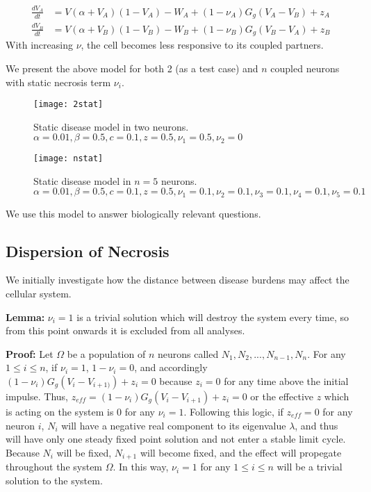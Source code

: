 \documentclass[11pt]{report}
\begin{document}
\begin{align}
\frac{dV_A}{dt} &= V(\alpha +V_A)(1-V_A) -W_A + (1-\nu_A) G_g(V_A-V_B) + z_A\\
\frac{dV_B}{dt} &= V(\alpha +V_B)(1-V_B) -W_B + (1-\nu_B) G_g(V_B-V_A) +z_B
\end{align}
With increasing $\nu$, the cell becomes less responsive to its coupled partners.

We present the above model for both 2 (as a test case) and $n$ coupled neurons with static necrosis term $\nu_i$.

\begin{figure}[!ht]
  \caption{Static disease model in two neurons. $\alpha = 0.01, \beta = 0.5,c = 0.1,z = 0.5, \nu_1 = 0.5, \nu_2 = 0$ }
  \centering
    \texttt{[image: 2stat]}
\end{figure}


\begin{figure}[!ht]
  \caption{Static disease model in $n=5$ neurons. $\alpha = 0.01, \beta = 0.5,c = 0.1,z = 0.5, \nu_1 = 0.1, \nu_2 = 0.1, \nu_3 = 0.1, \nu_4 = 0.1, \nu_5 = 0.1$ }
  \centering
    \texttt{[image: nstat]}
\end{figure}


We use this model to answer biologically relevant questions. 

\subsection{Dispersion of Necrosis} %
\label{sub:dispersion_of_necrosis}


We initially investigate how the distance between disease burdens may affect the cellular system.

\textbf{Lemma:} $\nu_i=1$ is a trivial solution which will destroy the system every time, so from this point onwards it is excluded from all analyses.

\textbf{Proof:} Let $\Omega$ be a population of $n$ neurons called $N_1, N_2, ..., N_{n-1}, N_n$. For any $1 \leq i \leq n$, if $\nu_i=1$, $1-\nu_i=0$, and accordingly $(1-\nu_i) G_g(V_i-V_{i+1)}) + z_i=0$ because $z_i=0$ for any time above the initial impulse. Thus, $z_{eff} = (1-\nu_i) G_g(V_i-V_{i+1}) + z_i = 0$ or the effective $z$ which is acting on the system is $0$ for any $\nu_i=1$. Following this logic, if $z_{eff}=0$ for any neuron $i$, $N_i$ will have a negative real component to its eigenvalue $\lambda$, and thus will have only one steady fixed point solution and not enter a stable limit cycle. Because $N_i$ will be fixed, $N_{i+1}$ will become fixed, and the effect will propegate throughout the system $\Omega$. In this way, $\nu_i=1$ for any $1 \leq i \leq n$ will be a trivial solution to the system.
\end{document}

